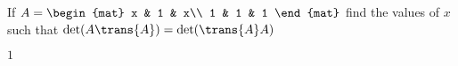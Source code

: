 
\begin{Exercise}[
name={},
title={}, 
difficulty=0,
origin={\cite{BS}}]
If $A=\begin{mat}
x & 1 & x\\
1 & 1 & 1
\end{mat}$
find the values of $x$ such that $\det(A\trans{A})=\det(\trans{A}A)$
\end{Exercise}

\begin{Answer}
$1$
\end{Answer}
